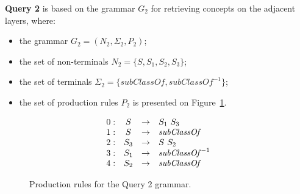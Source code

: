 

\textbf{Query 2} is based on the grammar $G_2$ for retrieving concepts on the adjacent layers, where:
\begin{itemize}
	\item the grammar $G_2 = (N_2, \Sigma_2, P_2)$;
	\item the set of non-terminals $N_2 = \{S, S_1, S_2, S_3\}$;
	\item the set of terminals $\Sigma_2 = \{subClassOf, subClassOf^{-1}\}$;
	\item the set of production rules $P_2$ is presented on Figure~\ref{ProductionRulesQuery2}.
\end{itemize}

\begin{figure}[h]
	\[
	\begin{array}{rccl}
	0: & S & \rightarrow & S_1 \ S_3 \\ 
	1: & S & \rightarrow & \text{\emph{subClassOf}} \\
	2: & S_3 & \rightarrow & S \ S_2 \\ 
	3: & S_1 & \rightarrow & \text{\emph{subClassOf}}^{-1} \\
	4: & S_2 & \rightarrow & \text{\emph{subClassOf}} \\
	\end{array}
	\]
	\caption{Production rules for the Query 2 grammar.}
	\label{ProductionRulesQuery2}
\end{figure}

